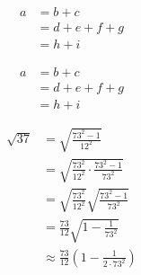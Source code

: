 \documentclass{article}
\begin{document}
\begin{equation}\tag{2}\label{eq2}\begin{aligned}
a &= b + c \\
  &= d + e + f + g \\
  &= h + i
\end{aligned}\end{equation}

\begin{equation}\begin{aligned}
a &= b + c \\
  &= d + e + f + g \\
  &= h + i
\end{aligned}\tag{2}\label{eq2}\end{equation}

\begin{align}
\sqrt{37} &= \sqrt{\frac{73^2-1}{12^2}} \\
 &= \sqrt{\frac{73^2}{12^2}\cdot\frac{73^2-1}{73^2}} \\
 &= \sqrt{\frac{73^2}{12^2}}\sqrt{\frac{73^2-1}{73^2}} \\
 &= \frac{73}{12}\sqrt{1 - \frac{1}{73^2}} \\
 &\approx \frac{73}{12}\left(1 - \frac{1}{2\cdot73^2}\right)
\end{align}
\end{document}
